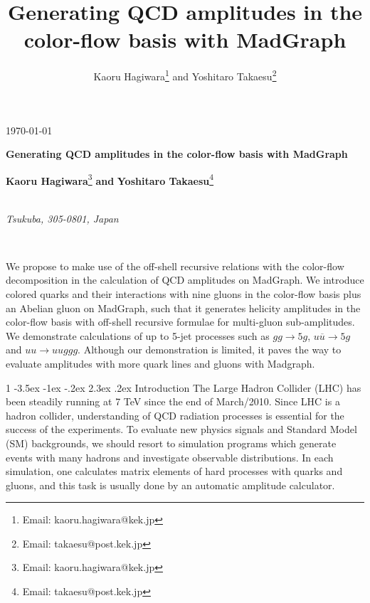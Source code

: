 \documentclass[a4paper,11pt]{article}
\title{Generating QCD amplitudes in the color-flow basis with MadGraph}
\author{Kaoru Hagiwara\footnote{Email: kaoru.hagiwara@kek.jp} and
Yoshitaro Takaesu\footnote{Email: takaesu@post.kek.jp}}
\makeatletter
\renewcommand{\section}{%
  \@startsection{section}%
   {1}%
   {\z@}%
   {-3.5ex \@plus -1ex \@minus -.2ex}%
   {2.3ex \@plus.2ex}%
   {\normalfont\large\bfseries}%
}%
\makeatother
\begin{document}
\begin{titlepage}
\begin{flushright}
\today\\
\end{flushright}
\begin{center}
\vspace{15em}
{\LARGE {\bf Generating QCD amplitudes in the color-flow basis with MadGraph}}

\vspace{5em}
{\rm\Large {\bf Kaoru Hagiwara}}\footnote{Email: kaoru.hagiwara@kek.jp} {\bf\Large and}
 {\rm\Large {\bf Yoshitaro Takaesu}}\footnote{Email: takaesu@post.kek.jp}

\vspace{1em}
\\
{\it Tsukuba, 305-0801, Japan}

\vspace{9em}
\\
 \end{center}
We propose to make use of the off-shell
recursive relations with the color-flow decomposition in the calculation of QCD amplitudes on
MadGraph. We introduce colored quarks and their interactions with nine
gluons in the color-flow basis plus an Abelian gluon on MadGraph, such
that it generates helicity amplitudes in the color-flow basis with off-shell recursive
formulae for multi-gluon sub-amplitudes. We demonstrate calculations of up to 5-jet processes such as
$gg\rightarrow 5g$, $u\overline{u}\rightarrow 5g$ and $uu\rightarrow uuggg$. Although our
demonstration is limited, it paves the way to evaluate amplitudes with
more quark lines and gluons with Madgraph.
\end{titlepage}

\section{Introduction}
\label{intro}
The Large Hadron Collider (LHC) has been steadily running at 7 TeV since the
end of March/2010. Since LHC is a hadron
collider, understanding of QCD radiation processes is essential for the success of the experiments. To evaluate new physics signals
and Standard Model (SM) backgrounds, we should resort to simulation programs which generate
events with many hadrons and investigate observable distributions. In each simulation,
one calculates matrix elements of hard processes with quarks and gluons,
and this task is usually done by an automatic amplitude calculator.
\end{document}
